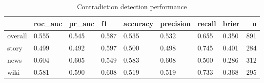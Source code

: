 \begin{table}
\caption{Contradiction detection performance}
\label{tab:results}
\begin{tabular}{llllllllr}
\toprule
 & roc_auc & pr_auc & f1 & accuracy & precision & recall & brier & n \\
\midrule
overall & 0.555 & 0.545 & 0.587 & 0.535 & 0.532 & 0.655 & 0.350 & 891 \\
story & 0.499 & 0.492 & 0.597 & 0.500 & 0.498 & 0.745 & 0.401 & 284 \\
news & 0.604 & 0.605 & 0.549 & 0.583 & 0.608 & 0.500 & 0.286 & 312 \\
wiki & 0.581 & 0.590 & 0.608 & 0.519 & 0.519 & 0.733 & 0.368 & 295 \\
\bottomrule
\end{tabular}
\end{table}
